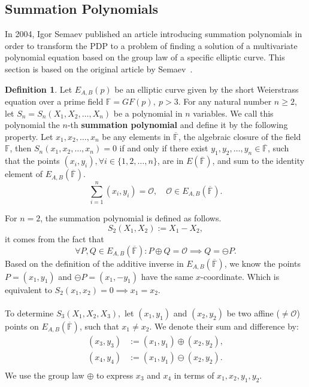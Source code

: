 \documentclass[thesis=M,english]{FITthesis}[2012/10/20]
\theoremstyle{remark}
\theoremstyle{definition}
\newtheorem{DF}{Definition}[section]
\begin{document}
\subsection{Summation Polynomials}\label{sumpoly}
\noindent In 2004, Igor Semaev published an article introducing summation polynomials in order to transform the PDP to a problem of finding a solution of a multivariate polynomial equation based on the group law of a specific elliptic curve. This section is based on the original article by Semaev~\cite{semaev04}.
\begin{DF}
Let $E_{A,B}(p)$ be an elliptic curve given by the short Weierstrass equation over a prime field $\mathbb{F} = GF(p),\ p > 3$. For any natural number $n \geq 2$, let $S_n = S_n(X_1, X_2, \ldots, X_n)$ be a polynomial in $n$ variables. We call this polynomial the $n$-th \textbf{summation polynomial} and define it by the following property. Let $x_1,x_2,\ldots,x_n$ be any elements in $\overline{\mathbb{F}}$, the algebraic closure of the field $\mathbb{F}$, then $S_n(x_1,x_2,\ldots,x_n)=0$ if and only if there exist $y_1,y_2,\ldots,y_n \in \overline{\mathbb{F}}$, such that the points $(x_i,y_i), \forall i \in \{1,2,\ldots,n\}$, are in $E(\overline{\mathbb{F}})$, and sum to the identity element of $E_{A,B}(\overline{\mathbb{F}})$.
$$
\sum_{i=1}^n (x_i,y_i) = \mathcal{O}, \quad  \mathcal{O} \in E_{A,B}(\overline{\mathbb{F}}).
$$
\end{DF}
For $n=2$, the summation polynomial is defined as follows. 
$$
S_2(X_1, X_2) := X_1 - X_2,
$$ it comes from the fact that 
$$
\forall P, Q \in E_{A,B}(\overline{\mathbb{F}}): P \oplus Q = \mathcal{O} \implies  Q = \ominus P.
$$
Based on the definition of the additive inverse in $E_{A,B}(\overline{\mathbb{F}})$, we know the points $P = (x_1,y_1)$ and $\ominus P = (x_1, -y_1)$ have the same $x$-coordinate. Which is equivalent to $S_2(x_1, x_2) = 0 \implies x_1 = x_2.$ 
\\\\
\noindent To determine $S_3(X_1,X_2,X_3),$ let $(x_1,y_1)$ and $(x_2, y_2)$ be two affine ($\neq  \mathcal{O}$) points on $E_{A,B}(\overline{\mathbb{F}})$, such that $x_1 \neq x_2.$ We denote their sum and difference by:
\begin{align*}
(x_3,y_3) &:= (x_1,y_1) \oplus (x_2,y_2),\\
(x_4,y_4) &:= (x_1,y_1) \ominus (x_2,y_2).\\
\end{align*}
We use the group law $\oplus$ to express $x_3$ and $x_4$ in terms of $x_1,x_2, y_1, y_2$.
\end{document}
